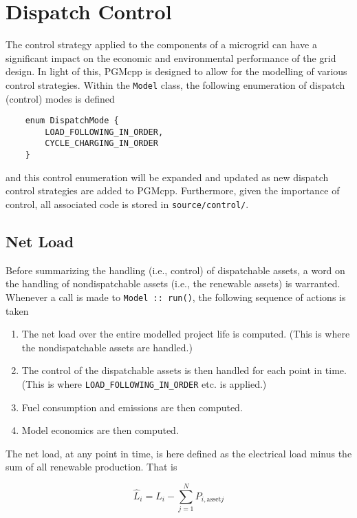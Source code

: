 \documentclass[12pt, letterpaper]{report}
\begin{document}
\chapter{Dispatch Control}

The control strategy applied to the components of a microgrid can have a significant impact on the economic and environmental performance of the grid design. In light of this, PGMcpp is designed to allow for the modelling of various control strategies. Within the \texttt{Model} class, the following enumeration of dispatch (control) modes is defined

\begin{verbatim}
    enum DispatchMode {
        LOAD_FOLLOWING_IN_ORDER,
        CYCLE_CHARGING_IN_ORDER
    }
\end{verbatim}

\noindent and this control enumeration will be expanded and updated as new dispatch control strategies are added to PGMcpp. Furthermore, given the importance of control, all associated code is stored in \texttt{source/control/}.

\section{Net Load}

Before summarizing the handling (i.e., control) of dispatchable assets, a word on the handling of nondispatchable assets (i.e., the renewable assets) is warranted. Whenever a call is made to \texttt{Model :: run()}, the following sequence of actions is taken

\begin{enumerate}
    \item The net load over the entire modelled project life is computed. (This is where the nondispatchable assets are handled.)
    \item The control of the dispatchable assets is then handled for each point in time. (This is where \texttt{LOAD\_FOLLOWING\_IN\_ORDER} etc. is applied.)
    \item Fuel consumption and emissions are then computed.
    \item Model economics are then computed.
\end{enumerate}

The net load, at any point in time, is here defined as the electrical load minus the sum of all renewable production. That is

\begin{equation}
    \widehat{L}_i = L_i - \sum_{j=1}^N P_{i,\textrm{asset} j}
    \label{eqn:net_load}
\end{equation}
\end{document}
